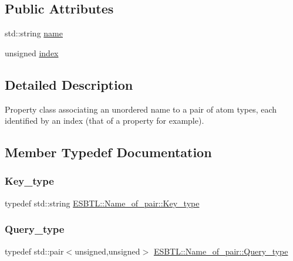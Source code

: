 \subsection*{Public Attributes}
\begin{DoxyCompactItemize}
\item 
std\+::string \hyperlink{classESBTL_1_1Name__of__pair_af11f24432e0ae4c9d1dfc7e2ad196083}{name}
\item 
unsigned \hyperlink{classESBTL_1_1Name__of__pair_ae1b3ec3c4c530ad07834b70d1083990b}{index}
\end{DoxyCompactItemize}


\subsection{Detailed Description}
Property class associating an unordered name to a pair of atom types, each identified by an index (that of a property for example). 

\subsection{Member Typedef Documentation}
\mbox{\label{classESBTL_1_1Name__of__pair_af5890e369891d99cc6db0b7d9e9f882f}} 
\subsubsection{\texorpdfstring{Key\+\_\+type}{Key\_type}}
{\footnotesize\ttfamily typedef std\+::string \hyperlink{classESBTL_1_1Name__of__pair_af5890e369891d99cc6db0b7d9e9f882f}{E\+S\+B\+T\+L\+::\+Name\+\_\+of\+\_\+pair\+::\+Key\+\_\+type}}

\mbox{\label{classESBTL_1_1Name__of__pair_a75882a894530f0974e91933d4fe0f89b}} 
\subsubsection{\texorpdfstring{Query\+\_\+type}{Query\_type}}
{\footnotesize\ttfamily typedef std\+::pair$<$unsigned,unsigned$>$ \hyperlink{classESBTL_1_1Name__of__pair_a75882a894530f0974e91933d4fe0f89b}{E\+S\+B\+T\+L\+::\+Name\+\_\+of\+\_\+pair\+::\+Query\+\_\+type}}



